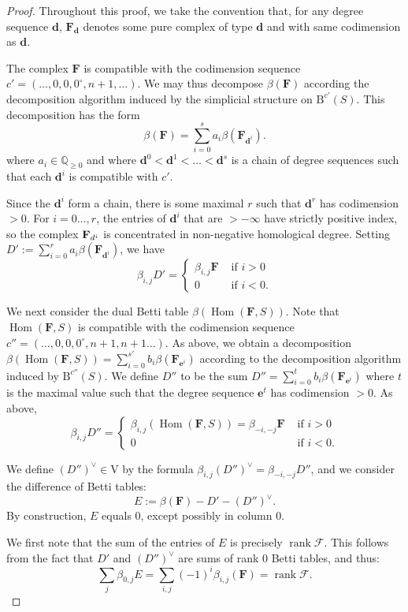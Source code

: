\documentclass[12pt]{amsart}
\theoremstyle{definition}
\theoremstyle{remark}
\newcommand{\Hom}{\operatorname{Hom}} %
\newcommand{\rank}{\operatorname{rank}}
\newcommand{\QQ}{\mathbb{Q}}
\newcommand{\VV}{\mathrm{V}}
\newcommand{\cc}{c}
\newcommand{\dd}{\mathbf{d}}
\newcommand{\ee}{\mathbf{e}}
\newcommand{\cF}{\mathcal{F}}
\newcommand{\FF}{\mathbf{F}}
\newcommand{\zp}{\circ}
\newcommand{\BBQ}{\mathrm{B}}
\begin{document}
\begin{proof}
Throughout this proof, we take the convention that, for any degree sequence $\dd$, $\FF_{\dd}$ denotes some pure complex of type $\dd$ and with same codimension as $\dd$.

The complex $\FF$ is compatible with the codimension sequence $\cc'=(\dots,0,0,0^{\zp},n+1,\dots)$. We may thus decompose $\beta(\FF)$ according the decomposition algorithm induced by the simplicial structure on $\BBQ^{\cc'}(S)$.  This decomposition has the form
\[
\beta(\FF)=\sum_{i=0}^s a_i\beta(\FF_{\dd^i}).
\]
where $a_i\in \QQ_{\geq 0}$ and where $\dd^0<\dd^1<\dots <\dd^s$ is a chain of degree sequences such that each $\dd^i$ is compatible with $\cc'$.

Since the $\dd^i$ form a chain, there is some maximal $r$ such that $\dd^r$ has codimension $>0$.  For $i=0\dots,r$, the entries of $\dd^{i}$ that are $>-\infty$ have strictly positive index, so the complex $\FF_{\\d^{i}}$ is concentrated in non-negative 
homological degree. Setting $D':=\sum_{i=0}^r a_i\beta(\FF_{\dd^i})$, we have 
\[
\beta_{i,j}D'=\begin{cases}
\beta_{i,j}\FF &\text{ if } i>0\\
0 & \text{ if } i<0.
\end{cases}
\]

We next consider the dual Betti table $\beta(\Hom(\FF,S))$.  Note that $\Hom(\FF,S)$ is compatible with the codimension sequence $\cc''=(\dots,0,0,0^{\zp},n+1,n+1\dots)$.  As above, we obtain a decomposition $\beta(\Hom(\FF,S))=\sum_{i=0}^{s'} b_i\beta(\FF_{\ee^i})$ according to the decomposition algorithm induced by $\BBQ^{\cc''}(S)$.  We define $D''$ to be the sum $D''=\sum_{i=0}^{t} b_i\beta(\FF_{\ee^i})$ where $t$ is the maximal value such that the degree sequence $\ee^t$ has codimension $>0$.  
As above, 
\[
\beta_{i,j}D''=\begin{cases}
\beta_{i,j}(\Hom(\FF,S))=\beta_{-i,-j}\FF &\text{ if } i>0\\
0 & \text{ if } i<0.
\end{cases}
\]

We define $(D'')^\vee\in \VV$ by the formula $\beta_{i,j}(D'')^\vee=\beta_{-i,-j}D''$, and we consider the difference of Betti tables:
\[
E:=\beta(\FF)-D'-(D'')^\vee.
\]
By construction, $E$ equals $0$, except possibly in column $0$.  

We first note that the sum of the entries of $E$ is precisely $\rank \cF$.  This follows from the fact that $D'$ and $(D'')^\vee$ are sums of rank $0$ Betti tables, and thus:
\[
\sum_j \beta_{0,j} E= \sum_{i,j} (-1)^i\beta_{i,j}(\FF)=\rank \cF.
\]


\end{proof}
\end{document}
